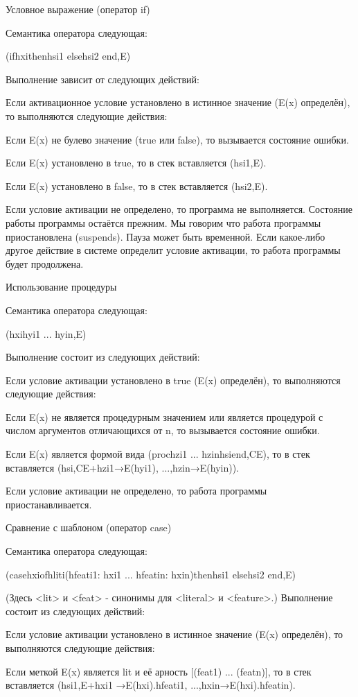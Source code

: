 Условное выражение (оператор if)

Семантика оператора следующая:

(ifhxithenhsi1 elsehsi2 end,E)

Выполнение зависит от следующих действий:

Если активационное условие установлено в истинное значение (E(x) определён), то выполняются следующие действия:

Если E(x) не булево значение (true или false), то вызывается состояние ошибки.

Если E(x) установлено в true, то в стек вставляется (hsi1,E).

Если E(x) установлено в false, то в стек вставляется (hsi2,E).

Если условие активации не определено, то программа не выполняется. Состояние работы программы остаётся прежним. Мы говорим что работа программы приостановлена (suspends). Пауза может быть временной. Если какое-либо другое действие в системе определит условие активации, то работа программы будет продолжена.

Использование процедуры

Семантика оператора следующая:

({hxihyi1 ... hyin},E)

Выполнение состоит из следующих действий:

Если условие активации установлено в true (E(x) определён), то выполняются следующие действия:

Если E(x) не является процедурным значением или является процедурой с числом аргументов отличающихся от n, то вызывается состояние ошибки.

Если E(x) является формой вида (proc{hzi1 ... hzin}hsiend,CE), то в стек вставляется (hsi,CE+{hzi1→E(hyi1), ...,hzin→E(hyin)}).

Если условие активации не определено, то работа программы приостанавливается.

Сравнение с шаблоном (оператор case)

Семантика оператора следующая:

(casehxiofhliti(hfeati1: hxi1 ... hfeatin: hxin)thenhsi1 elsehsi2 end,E)

(Здесь <lit> и <feat> - синонимы для <literal> и <feature>.) Выполнение состоит из следующих действий:

Если условие активации установлено в истинное значение (E(x) определён), то выполняются следующие действия:

Если меткой E(x) является lit и её арность [(feat1) ... (featn)], то в стек вставляется (hsi1,E+{hxi1 →E(hxi).hfeati1, ...,hxin→E(hxi).hfeatin}).


